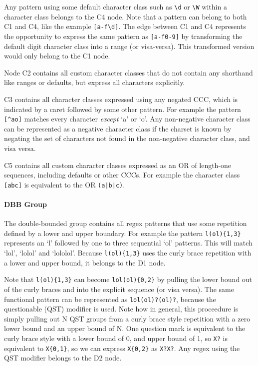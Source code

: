 Any pattern using some default character class such as \verb!\d! or \verb!\W! within a character class belongs to the C4 node.  Note that a pattern can belong to both C1 and C4, like the example \verb![a-f\d]!.  The edge between C1 and C4 represents the opportunity to express the same pattern as \verb![a-f0-9]! by transforming the default digit character class into a range (or visa-versa).  This transformed version would only belong to the C1 node.

Node C2 contains all custom character classes that do not contain any shorthand like ranges or defaults, but express all characters explicitly.

C3 contains all character classes expressed using any negated CCC, which is indicated by a caret followed by some other pattern.  For example the pattern \verb![^ao]! matches every character \emph{except} `a' or `o'.  Any non-negative character class can be represented as a negative character class if the charset is known by negating the set of characters not found in the non-negative character class, and visa versa.

C5 contains all custom character classes expressed as an OR of length-one sequences, including defaults or other CCCs.  For example the character class \verb![abc]! is equivalent to the OR \verb!(a|b|c)!.


\paragraph{DBB Group}
The double-bounded group contains all regex patterns that use some repetition defined by a lower and upper boundary.  For example the pattern \verb!l(ol){1,3}! represents an `l' followed by one to three sequential `ol' patterns.  This will match `lol', `lolol' and `lololol'.  Because \verb!l(ol){1,3}! uses the curly brace repetition with a lower and upper bound, it belongs to the D1 node.

Note that  \verb!l(ol){1,3}! can become \verb!lol(ol){0,2}! by pulling the lower bound out of the curly braces and into the explicit sequence (or visa versa).  The same functional pattern can be represented as \verb!lol(ol)?(ol)?!, because the questionable (QST) modifier is used.  Note how in general, this proceedure is simply pulling out N QST groups from a curly brace style repetition with a zero lower bound and an upper bound of N.  One question mark is equivalent to the curly brace style with a lower bound of 0, and upper bound of 1, so \verb!X?! is equivalent to \verb!X{0,1}!, so we can express \verb!X{0,2}! as \verb!X?X?!.  Any regex using the QST modifier belongs to the D2 node.

